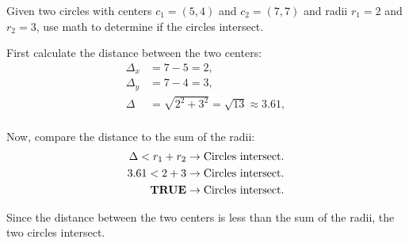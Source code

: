 Given two circles with centers $c_1 = (5, 4)$ and $c_2 = (7, 7)$ and radii $r_1
    = 2$ and $r_2 = 3$, use math to determine if the circles intersect.

First calculate the distance between the two centers:
\begin{equation*}
    \begin{aligned}
        \Delta_x & = 7 - 5 = 2,                                 \\
        \Delta_y & = 7 - 4 = 3,                                 \\
        \Delta   & = \sqrt{2^2 + 3^2} = \sqrt{13} \approx 3.61, \\
    \end{aligned}
\end{equation*}

Now, compare the distance to the sum of the radii:
\begin{equation*}
    \begin{aligned}
        \Delta < r_1 + r_2         & \rightarrow \textnormal{Circles intersect.} \\
        3.61 < 2 + 3               & \rightarrow \textnormal{Circles intersect.} \\
        \textnormal{\textbf{TRUE}} & \rightarrow \textnormal{Circles intersect.} \\
    \end{aligned}
\end{equation*}

Since the distance between the two centers is less than the sum of the radii,
the two circles intersect.

